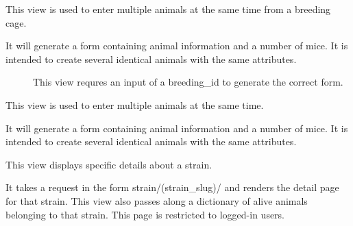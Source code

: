\documentclass[letterpaper,10pt,english]{sphinxmanual}
\begin{document}
\begin{fulllineitems}
\begin{fulllineitems}
\end{fulllineitems}


\begin{fulllineitems}
\label{api:animal.views.multiple_breeding_pups}
This view is used to enter multiple animals at the same time from a breeding cage.
\begin{description}
\item[{It will generate a form containing animal information and a number of mice.  It is intended to create several identical animals with the same attributes.}] \leavevmode
This view requres an input of a breeding\_id to generate the correct form.

\end{description}

\end{fulllineitems}


\begin{fulllineitems}
\label{api:animal.views.multiple_pups}
This view is used to enter multiple animals at the same time.

It will generate a form containing animal information and a number of mice.  It is intended to create several identical animals with the same attributes.

\end{fulllineitems}


\begin{fulllineitems}
\label{api:animal.views.strain_detail}
This view displays specific details about a strain.

It takes a request in the form strain/(strain\_slug)/ and renders the detail page for that strain.
This view also passes along a dictionary of alive animals belonging to that strain.
This page is restricted to logged-in users.

\end{fulllineitems}



\end{fulllineitems}
\end{document}
